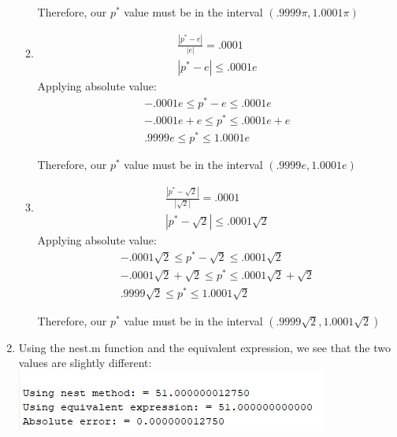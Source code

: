 \documentclass[12pt,letterpaper]{article}
\begin{document}
\begin{enumerate}
\begin{enumerate}
      Therefore, our $p^*$ value must be in the interval $(.9999\pi,1.0001\pi)$
      \item 
      \begin{gather}
        \frac{|p^* - e|}{|e|} = .0001 \\
        |p^* - e| \leq .0001e
      \end{gather}
      Applying absolute value: 
      \begin{gather}
        -.0001e \leq p^*-e \leq .0001e \\
        -.0001e+ e \leq p^* \leq .0001e + e\\
        .9999e \leq p^* \leq 1.0001e
      \end{gather}

      Therefore, our $p^*$ value must be in the interval $(.9999e,1.0001e)$
      \item 
      \begin{gather}
        \frac{|p^* - \sqrt{2}|}{|\sqrt{2}|} = .0001 \\
        |p^* - \sqrt{2}| \leq .0001\sqrt{2}
      \end{gather}
      Applying absolute value: 
      \begin{gather}
        -.0001\sqrt{2} \leq p^*-\sqrt{2} \leq .0001\sqrt{2} \\
        -.0001\sqrt{2}+ \sqrt{2} \leq p^* \leq .0001\sqrt{2} + \sqrt{2}\\
        .9999\sqrt{2} \leq p^* \leq 1.0001\sqrt{2}
      \end{gather}

      Therefore, our $p^*$ value must be in the interval $(.9999\sqrt{2},1.0001\sqrt{2})$
    \end{enumerate}

    \item Using the nest.m function and the equivalent expression, we see that the 
    two values are slightly different: \\
    \includegraphics{number4.png}
\end{enumerate}
\end{document}

